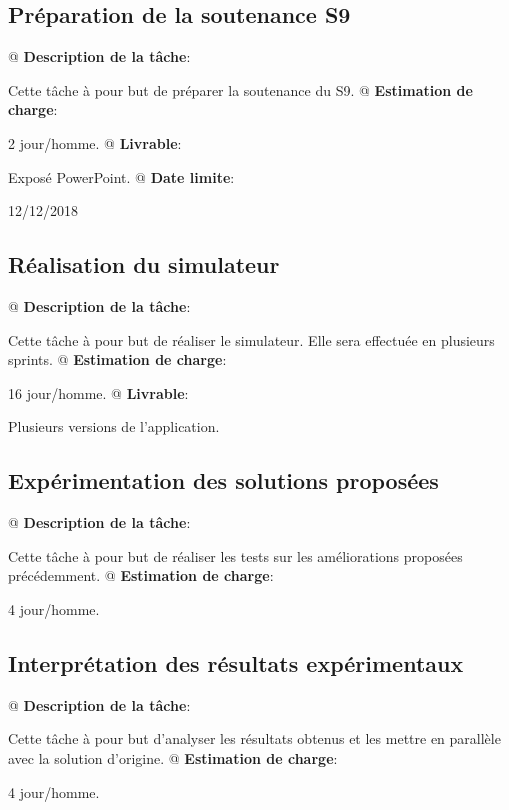 \documentclass[final]{polytech/polytech}
\begin{document}
		\subsection{Préparation de la soutenance S9}
			\begin{easylist}
				@ \textbf{Description de la tâche}:
				
				Cette tâche à pour but de préparer la soutenance du S9.
				@ \textbf{Estimation de charge}:
				
				2 jour/homme.
				@ \textbf{Livrable}:
				
				Exposé PowerPoint.
				@ \textbf{Date limite}:
				
				12/12/2018
			\end{easylist}
			
		\subsection{Réalisation du simulateur}
			\begin{easylist}
				@ \textbf{Description de la tâche}:
				
				Cette tâche à pour but de réaliser le simulateur.
				Elle sera effectuée en plusieurs sprints.
				@ \textbf{Estimation de charge}:
				
				16 jour/homme.
				@ \textbf{Livrable}:
				
				Plusieurs versions de l'application.
			\end{easylist}
			
		\subsection{Expérimentation des solutions proposées}
			\begin{easylist}
				@ \textbf{Description de la tâche}:
				
				Cette tâche à pour but de réaliser les tests sur les améliorations proposées précédemment.			
				@ \textbf{Estimation de charge}:
				
				4 jour/homme.
			\end{easylist}
			
		\subsection{Interprétation des résultats expérimentaux}
			\begin{easylist}
				@ \textbf{Description de la tâche}:
				
				Cette tâche à pour but d'analyser les résultats obtenus et les mettre en parallèle avec la solution d'origine.			
				@ \textbf{Estimation de charge}:
				
				4 jour/homme.
			\end{easylist}
			
\end{document}
